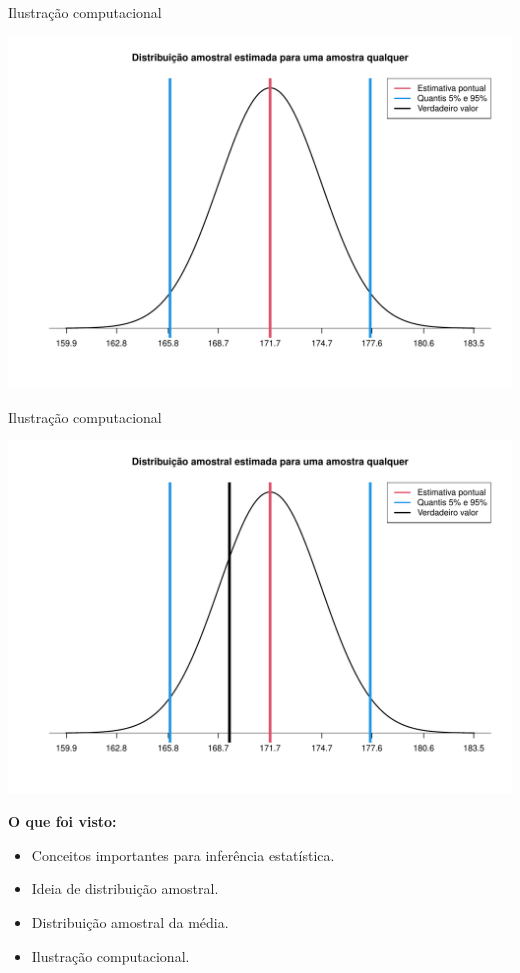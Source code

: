 \documentclass[
  ignorenonframetext,
  serif,
  professionalfont,
  usenames,
  dvipsnames,
  aspectratio = 169]{beamer}
\providecommand{\tightlist}{%
  \setlength{\itemsep}{0pt}\setlength{\parskip}{0pt}}
\renewcommand{\tightlist}{%
  \setlength{\itemsep}{0\baselineskip}
  \setlength{\parskip}{0.25\baselineskip}
}
\begin{document}
\begin{frame}{Ilustração computacional}
\protect\hypertarget{ilustrauxe7uxe3o-computacional-10}{}
\begin{center}\includegraphics[width=0.7\linewidth]{600-intro-inferencia_files/figure-beamer/unnamed-chunk-7-1} \end{center}
\end{frame}

\begin{frame}{Ilustração computacional}
\protect\hypertarget{ilustrauxe7uxe3o-computacional-11}{}
\begin{center}\includegraphics[width=0.7\linewidth]{600-intro-inferencia_files/figure-beamer/unnamed-chunk-8-1} \end{center}
\end{frame}

\begin{frame}{}
\protect\hypertarget{section}{}
\textbf{O que foi visto:}

\begin{itemize}
\tightlist
\item
  Conceitos importantes para inferência estatística.
\item
  Ideia de distribuição amostral.
\item
  Distribuição amostral da média.
\item
  Ilustração computacional.
\end{itemize}
\end{frame}
\end{document}
